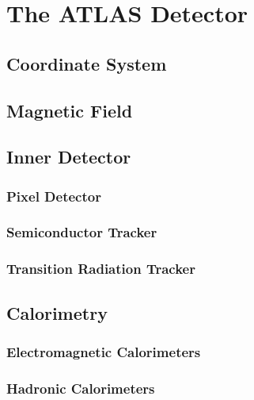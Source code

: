 \chapter{The ATLAS Detector}

\label{ch:atlas}

\section{Coordinate System}


\section{Magnetic Field}


\section{Inner Detector}

\subsection{Pixel Detector}

\subsection{Semiconductor Tracker}

\subsection{Transition Radiation Tracker}


\section{Calorimetry}

\subsection{Electromagnetic Calorimeters}

\subsection{Hadronic Calorimeters}

